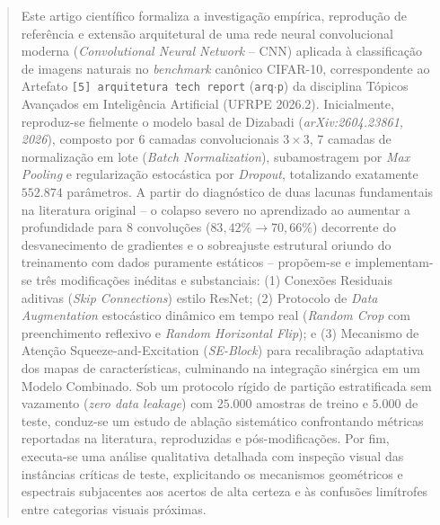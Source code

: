 \documentclass[runningheads]{llncs}
\begin{document}
\begin{abstract}
Este artigo cient\'{i}fico formaliza a investiga\c{c}\~{a}o emp\'{i}rica, reprodu\c{c}\~{a}o de refer\^{e}ncia e extens\~{a}o arquitetural de uma rede neural convolucional moderna (\textit{Convolutional Neural Network} -- CNN) aplicada \`{a} classifica\c{c}\~{a}o de imagens naturais no \textit{benchmark} can\^{o}nico CIFAR-10, correspondente ao Artefato \texttt{[5] arquitetura tech report} (\texttt{arq$\cdot$p}) da disciplina T\'{o}picos Avan\c{c}ados em Intelig\^{e}ncia Artificial (UFRPE 2026.2). Inicialmente, reproduz-se fielmente o modelo basal de Dizabadi (\textit{arXiv:2604.23861, 2026}), composto por 6 camadas convolucionais $3 \times 3$, 7 camadas de normaliza\c{c}\~{a}o em lote (\textit{Batch Normalization}), subamostragem por \textit{Max Pooling} e regulariza\c{c}\~{a}o estoc\'{a}stica por \textit{Dropout}, totalizando exatamente $552.874$ par\^{a}metros. A partir do diagn\'{o}stico de duas lacunas fundamentais na literatura original -- o colapso severo no aprendizado ao aumentar a profundidade para 8 convolu\c{c}\~{o}es ($83{,}42\% \to 70{,}66\%$) decorrente do desvanecimento de gradientes e o sobreajuste estrutural oriundo do treinamento com dados puramente est\'{a}ticos -- prop\~{o}em-se e implementam-se tr\^{e}s modifica\c{c}\~{o}es in\'{e}ditas e substanciais: (1) Conex\~{o}es Residuais aditivas (\textit{Skip Connections}) estilo ResNet; (2) Protocolo de \textit{Data Augmentation} estoc\'{a}stico din\^{a}mico em tempo real (\textit{Random Crop} com preenchimento reflexivo e \textit{Random Horizontal Flip}); e (3) Mecanismo de Aten\c{c}\~{a}o Squeeze-and-Excitation (\textit{SE-Block}) para recalibra\c{c}\~{a}o adaptativa dos mapas de caracter\'{i}sticas, culminando na integra\c{c}\~{a}o sin\'{e}rgica em um Modelo Combinado. Sob um protocolo r\'{i}gido de parti\c{c}\~{a}o estratificada sem vazamento (\textit{zero data leakage}) com $25.000$ amostras de treino e $5.000$ de teste, conduz-se um estudo de abla\c{c}\~{a}o sistem\'{a}tico confrontando m\'{e}tricas reportadas na literatura, reproduzidas e p\'{o}s-modifica\c{c}\~{o}es. Por fim, executa-se uma an\'{a}lise qualitativa detalhada com inspe\c{c}\~{a}o visual das inst\^{a}ncias cr\'{i}ticas de teste, explicitando os mecanismos geom\'{e}tricos e espectrais subjacentes aos acertos de alta certeza e \`{a}s confus\~{o}es lim\'{i}trofes entre categorias visuais pr\'{o}ximas.

\end{abstract}
\end{document}
